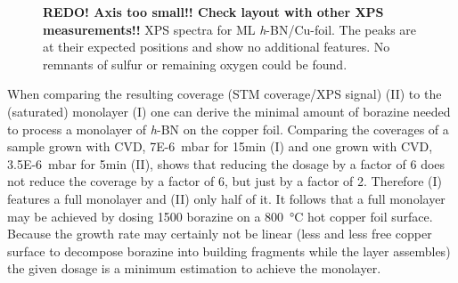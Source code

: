 \begin{figure}[ht]
	\centering
	\caption{\textbf{REDO! Axis too small!! Check layout with other XPS measurements!!} XPS spectra for ML \textit{h}-BN/Cu-foil. The peaks are at their expected positions\cite{kidambi_situ_2014} and show no additional features. No remnants of sulfur or remaining oxygen could be found.}
	\label{fig:xps-self-grown}
\end{figure}

When comparing the resulting coverage (STM coverage/XPS signal) (II) to the (saturated) monolayer (I) one can derive the minimal amount of borazine needed to process a monolayer of \textit{h}-BN on the copper foil. Comparing the coverages of a sample grown with CVD, \SI{7E-6}{\milli \bar} for 15min (I) and one grown with CVD, \SI{3.5E-6}{\milli \bar} for 5min (II), shows that reducing the dosage by a factor of 6 does not reduce the coverage by a factor of 6, but just by a factor of 2. Therefore (I) features a full monolayer and (II) only half of it. It follows that a full monolayer may be achieved by dosing \SI{1500}{\langmuir} borazine on a \SI{800}{\degreeCelsius} hot copper foil surface. 
Because the growth rate may certainly not be linear (less and less free copper surface to decompose borazine into building fragments while the layer assembles) the given dosage is a minimum estimation to achieve the monolayer.

